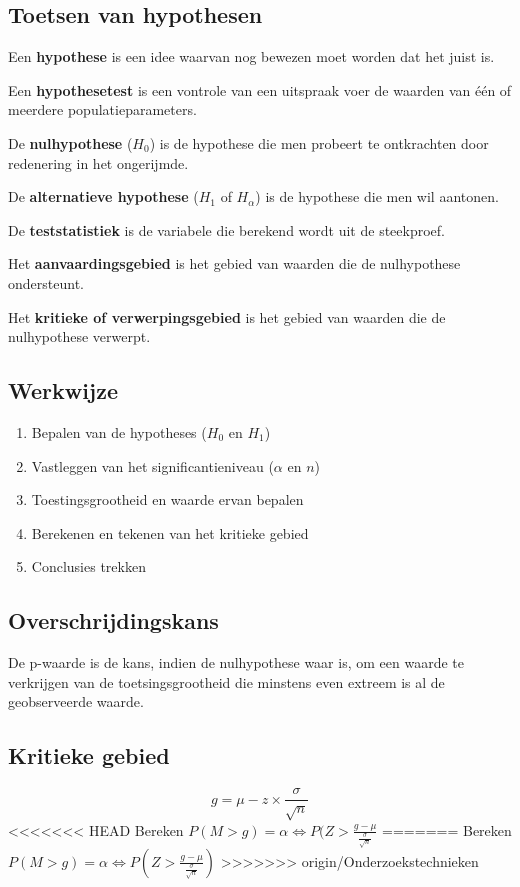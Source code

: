\documentclass[a4paper,12pt]{article}
\begin{document}
\subsection{Toetsen van hypothesen}
Een \textbf{hypothese} is een idee waarvan nog bewezen moet worden dat het juist is.

Een \textbf{hypothesetest} is een vontrole van een uitspraak voer de waarden van één of meerdere populatieparameters.

De \textbf{nulhypothese} ($H_0$) is de hypothese die men probeert te ontkrachten door redenering in het ongerijmde.

De \textbf{alternatieve hypothese} ($H_1$ of $H_\alpha$) is de hypothese die men wil aantonen.

De \textbf{teststatistiek} is de variabele die berekend wordt uit de steekproef.

Het \textbf{aanvaardingsgebied} is het gebied van waarden die de nulhypothese ondersteunt.

Het \textbf{kritieke of verwerpingsgebied} is het gebied van waarden die de nulhypothese verwerpt.

\subsection{Werkwijze}
\begin{enumerate}
\item Bepalen van de hypotheses ($H_0$ en $H_1$)
\item Vastleggen van het significantieniveau ($\alpha$ en $n$)
\item Toestingsgrootheid en waarde ervan bepalen
\item Berekenen en tekenen van het kritieke gebied
\item Conclusies trekken
\end{enumerate}

\subsection{Overschrijdingskans}
De p-waarde is de kans, indien de nulhypothese waar is, om een waarde te verkrijgen van de toetsingsgrootheid die minstens even extreem is al de geobserveerde waarde.

\subsection{Kritieke gebied}
\begin{equation}
g=\mu-z\times \frac{\sigma}{\sqrt{n}}
\end{equation}
<<<<<<< HEAD
Bereken $P(M>g)=\alpha \Leftrightarrow P(Z>\frac{g-\mu}{\frac{\sigma}{\sqrt{n}}}$
=======
Bereken $P(M>g)=\alpha \Leftrightarrow P(Z>\frac{g-\mu}{\frac{\sigma}{\sqrt{n}}})$
>>>>>>> origin/Onderzoekstechnieken
\end{document}
